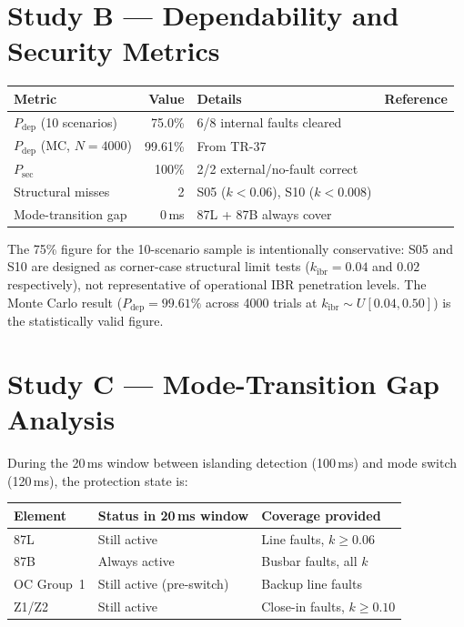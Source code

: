 \documentclass[11pt,a4paper]{article}
\begin{document}
\section{Study B --- Dependability and Security Metrics}
\label{sec:studyB}

\begin{center}
\begin{tabular}{@{}lrll@{}}
\toprule
Metric & Value & Details & Reference \\
\midrule
$P_\mathrm{dep}$ (10 scenarios) & 75.0\% & 6/8 internal faults cleared & \\
$P_\mathrm{dep}$ (MC, $N=4000$) & 99.61\% & From TR-37 & \cite{SAMBP_TR37} \\
$P_\mathrm{sec}$ & 100\% & 2/2 external/no-fault correct & \\
Structural misses & 2 & S05 ($k<0.06$), S10 ($k<0.008$) & \\
Mode-transition gap & 0\,ms & 87L + 87B always cover & \\
\bottomrule
\end{tabular}
\end{center}

\medskip\noindent
The 75\% figure for the 10-scenario sample is intentionally conservative: S05
and S10 are designed as corner-case structural limit tests ($k_\mathrm{ibr}=0.04$
and $0.02$ respectively), not representative of operational IBR penetration levels.
The Monte Carlo result ($P_\mathrm{dep}=99.61\%$ across 4000 trials at
$k_\mathrm{ibr}\sim U[0.04,0.50]$) is the statistically valid figure.

\section{Study C --- Mode-Transition Gap Analysis}
\label{sec:studyC}

During the 20\,ms window between islanding detection (100\,ms) and mode switch
(120\,ms), the protection state is:

\begin{center}
\begin{tabular}{@{}lll@{}}
\toprule
Element & Status in 20\,ms window & Coverage provided \\
\midrule
87L & Still active & Line faults, $k\geq0.06$ \\
87B & Always active & Busbar faults, all $k$ \\
OC Group~1 & Still active (pre-switch) & Backup line faults \\
Z1/Z2 & Still active & Close-in faults, $k\geq0.10$ \\
\bottomrule
\end{tabular}
\end{center}
\end{document}
